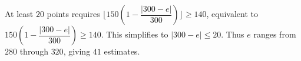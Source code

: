 At least $20$ points requires $\lfloor150(1-\dfrac{|300-e|}{300})\rfloor\ge140$, equivalent to $150(1-\dfrac{|300-e|}{300})\ge140$. This simplifies to $|300-e|\le20$. Thus $e$ ranges from $280$ through $320$, giving $\boxed{41}$ estimates.
